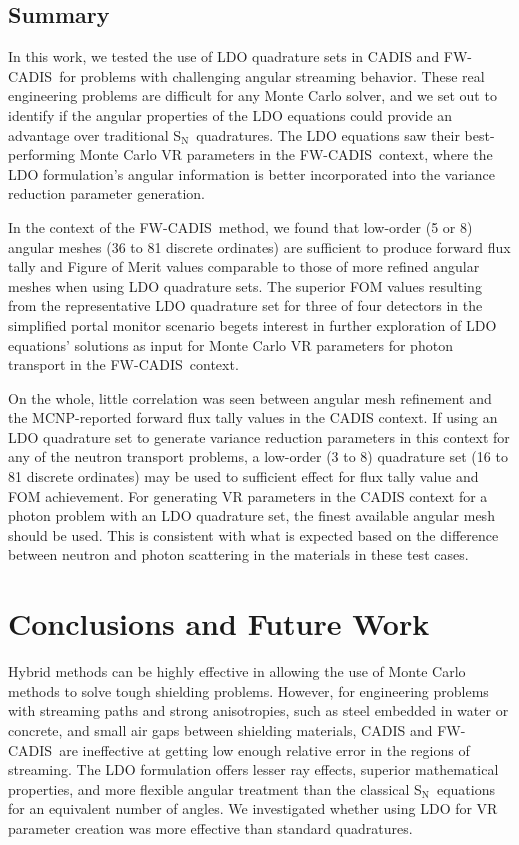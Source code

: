 \documentclass{article} %
\newcommand{\sn}{S$_\mathrm{N}$}
\newcommand{\fwc}{\mbox{FW-CADIS}}
\begin{document}
\subsection{Summary}

In this work, we tested the use of LDO quadrature sets in CADIS and \fwc\ for
problems with challenging angular streaming behavior. These real engineering
problems are difficult for any Monte Carlo solver, and we set out to identify
if the angular properties of the LDO equations could provide an advantage over
traditional \sn\ quadratures. The LDO equations saw their best-performing
Monte Carlo VR parameters in the \fwc\ context, where the LDO formulation's
angular information is better incorporated into the variance reduction
parameter generation.

In the context of the \fwc\ method, we found that low-order (5 or 8) angular
meshes (36 to 81 discrete ordinates) are sufficient to produce forward flux
tally and Figure of Merit values comparable to those of more refined angular
meshes when using LDO quadrature sets. The superior FOM values resulting from
the representative LDO quadrature set for three of four detectors in the
simplified portal monitor scenario begets interest in further exploration of
LDO equations' solutions as input for Monte Carlo VR parameters for photon
transport in the \fwc\ context.

On the whole, little correlation was seen between angular mesh refinement and
the MCNP-reported forward flux tally values in the CADIS context. If using an
LDO quadrature set to generate variance reduction parameters in this context
for any of the neutron transport problems, a low-order (3 to 8) quadrature
set (16 to 81 discrete ordinates) may be used to sufficient effect for flux
tally value and FOM achievement. For generating VR parameters in the CADIS
context for a photon problem with an LDO quadrature set, the finest available
angular mesh should be used. This is consistent with what is expected based on
the difference between neutron and photon scattering in the materials in these
test cases.

\section{Conclusions and Future Work}
\label{sec:conclusions}

Hybrid methods can be highly effective in allowing the use of Monte Carlo
methods to solve tough shielding problems. However, for engineering problems
with streaming paths and strong anisotropies, such as steel embedded in water or
concrete, and small air gaps between shielding materials, CADIS and \fwc\ are
ineffective at getting low enough relative error in the regions of streaming.
The LDO formulation offers lesser ray effects, superior mathematical properties,
and more flexible angular treatment than the classical \sn\ equations for an
equivalent number of angles. We investigated whether using LDO for VR parameter
creation was more effective than standard quadratures.
\end{document}
